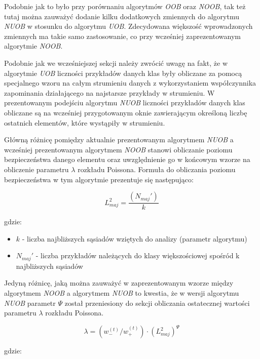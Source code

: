 \noindent Podobnie jak to było przy porównaniu algorytmów \textit{OOB} oraz \textit{NOOB}, tak też tutaj można zauważyć dodanie kilku dodatkowych zmiennych do algorytmu \textit{NUOB} w stosunku do algorytmu \textit{UOB}. Zdecydowana większość wprowadzonych zmiennych ma takie samo zastosowanie, co przy wcześniej zaprezentowanym algorytmie \textit{NOOB}.

Podobnie jak we wcześniejszej sekcji należy zwrócić uwagę na fakt, że w algorytmie \textit{UOB} liczności przykładów danych klas były obliczane za pomocą specjalnego wzoru na całym strumieniu danych z wykorzystaniem współczynnika zapominania działającego na najstarsze przykłady w strumieniu. W prezentowanym podejściu algorytmu \textit{NUOB} liczności przykładów danych klas obliczane są na wcześniej przygotowanym oknie zawierającym określoną liczbę ostatnich elementów, które wystąpiły w strumieniu.

Główną różnicę pomiędzy aktualnie prezentowanym algorytmem \textit{NUOB} a wcześniej prezentowanym algorytmem \textit{NOOB} stanowi obliczanie poziomu bezpieczeństwa danego elementu oraz uwzględnienie go w końcowym wzorze na obliczenie parametru $\lambda$ rozkładu Poissona. Formuła do obliczania poziomu bezpieczeństwa w tym algorytmie prezentuje się następująco:

\begin{equation}
    L^2_{maj} = \frac{(N_{maj}')}{k}
\end{equation}

\noindent gdzie:

\begin{itemize}
    \item $k$ - liczba najbliższych sąsiadów wziętych do analizy (parametr algorytmu)
    \item $N_{maj}'$ - liczba przykładów należących do klasy większościowej spośród k najbliższych sąsiadów
\end{itemize}

\noindent Jedyną różnicę, jaką można zauważyć w zaprezentowanym wzorze między algorytmem \textit{NOOB} a algorytmem \textit{NUOB} to kwestia, że w wersji algorytmu \textit{NUOB} parametr $\Psi$ został przeniesiony do sekcji obliczania ostatecznej wartości parametru $\lambda$ rozkładu Poissona.

\begin{equation}
    \lambda = (w^{(t)}_{-}/w^{(t)}_{+}) \cdot (L^2_{maj})^{\Psi}
\end{equation}

\noindent gdzie:

